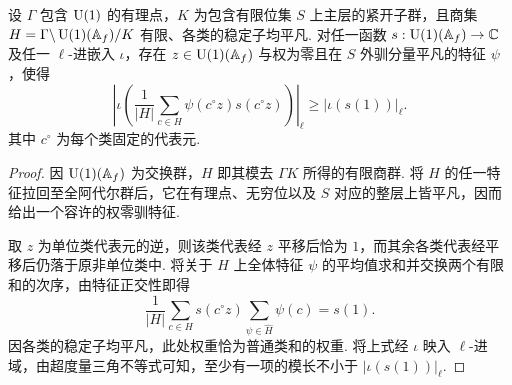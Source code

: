 \begin{lemma}[秩一类群上的扭转平均]
\label{lem:c-test-character-average}
\emitthmsource
设 $\Gamma$ 包含 $\operatorname{U}(1)$ 的有理点，$K$ 为包含有限位集 $S$ 上主层的紧开子群，且商集 $H=\Gamma\backslash \operatorname{U}(1)(\mathbb A_f)/K$ 有限、各类的稳定子均平凡. 对任一函数 $s:\operatorname{U}(1)(\mathbb A_f)\to\mathbb C$ 及任一 $\ell$-进嵌入 $\iota$，存在 $z\in \operatorname{U}(1)(\mathbb A_f)$ 与权为零且在 $S$ 外驯分量平凡的特征 $\psi$，使得
\[
 \left|\iota\left(\frac1{|H|}\sum_{c\in H}\psi(c^\circ z)s(c^\circ z)\right)\right|_\ell
 \ge |\iota(s(1))|_\ell .
\]
其中 $c^\circ$ 为每个类固定的代表元.
\end{lemma}
\begin{proof}
因 $\operatorname{U}(1)(\mathbb A_f)$ 为交换群，$H$ 即其模去 $\Gamma K$ 所得的有限商群. 将 $H$ 的任一特征拉回至全阿代尔群后，它在有理点、无穷位以及 $S$ 对应的整层上皆平凡，因而给出一个容许的权零驯特征.

取 $z$ 为单位类代表元的逆，则该类代表经 $z$ 平移后恰为 $1$，而其余各类代表经平移后仍落于原非单位类中. 将关于 $H$ 上全体特征 $\psi$ 的平均值求和并交换两个有限和的次序，由特征正交性即得
\[
 \frac1{|H|}\sum_{c\in H}s(c^\circ z)
         \sum_{\psi\in\widehat H}\psi(c)=s(1).
\]
因各类的稳定子均平凡，此处权重恰为普通类和的权重. 将上式经 $\iota$ 映入 $\ell$-进域，由超度量三角不等式可知，至少有一项的模长不小于 $|\iota(s(1))|_\ell$.
\end{proof}

